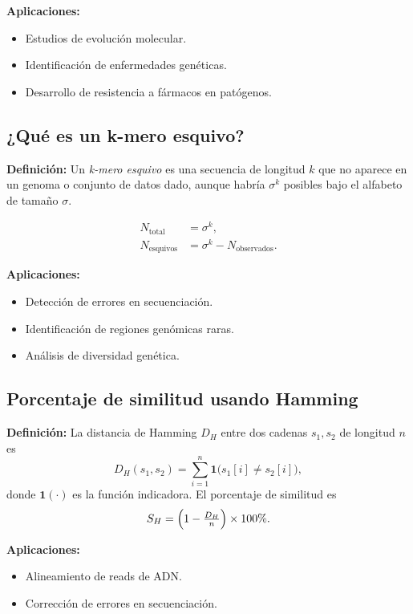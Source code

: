 \documentclass[fleqn,10pt]{article}
\begin{document}
\textbf{Aplicaciones:}
\begin{itemize}
    \item Estudios de evolución molecular.
    \item Identificación de enfermedades genéticas.
    \item Desarrollo de resistencia a fármacos en patógenos.
\end{itemize}

\subsection{¿Qué es un k-mero esquivo?}
\textbf{Definición:}
Un \emph{k-mero esquivo} es una secuencia de longitud \(k\) que no aparece en un genoma o conjunto de datos dado, aunque habría \(\sigma^k\) posibles bajo el alfabeto de tamaño \(\sigma\).

\medskip
\begin{align}
N_{\mathrm{total}} &= \sigma^k,\\
N_{\mathrm{esquivos}} &= \sigma^k - N_{\mathrm{observados}}.
\end{align}

\textbf{Aplicaciones:}
\begin{itemize}
    \item Detección de errores en secuenciación.
    \item Identificación de regiones genómicas raras.
    \item Análisis de diversidad genética.
\end{itemize}

\subsection{Porcentaje de similitud usando Hamming}
\textbf{Definición:}
La distancia de Hamming \(D_H\) entre dos cadenas \(s_1,s_2\) de longitud \(n\) es
\[
D_H(s_1,s_2)
= \sum_{i=1}^{n} \mathbf{1}\bigl(s_1[i]\neq s_2[i]\bigr),
\]
donde \(\mathbf{1}(\cdot)\) es la función indicadora.
El porcentaje de similitud es
\[
S_H = \Bigl(1 - \tfrac{D_H}{n}\Bigr)\times 100\%.
\]

\textbf{Aplicaciones:}
\begin{itemize}
    \item Alineamiento de reads de ADN.
    \item Corrección de errores en secuenciación.
\end{itemize}
\end{document}
